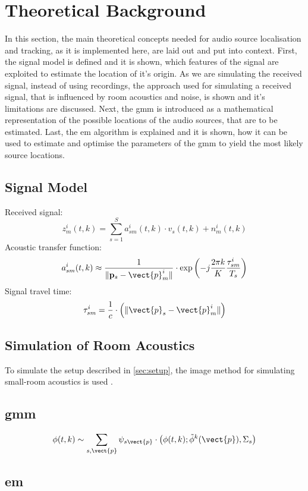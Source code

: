 \chapter{Theoretical Background}
\label{chap:theory}


In this section, the main theoretical concepts needed for audio source localisation and tracking, as it is implemented here, are laid out and put into context. First, the signal model is defined and it is shown, which features of the signal are exploited to estimate the location of it's origin. As we are simulating the received signal, instead of using recordings, the approach used for simulating a received signal, that is influenced by room acoustics and noise, is shown and it's limitations are discussed. Next, the \gls{gmm} is introduced as a mathematical representation of the possible locations of the audio sources, that are to be estimated. Last, the \gls{em} algorithm is explained and it is shown, how it can be used to estimate and optimise the parameters of the \gls{gmm} to yield the most likely source locations.

\section{Signal Model}
\label{sec:signal}
Received signal:
\begin{equation}
	z_m^i(t,k)=\sum_{s=1}^{S}a_{sm}^i(t,k)\cdot v_s(t,k)+n_m^i(t,k)
\end{equation}
Acoustic transfer function:
\begin{equation}
	a_{sm}^i(t,k)\approx\frac{1}{\|\mathbf{p}_s-\vect{p}_m^i\|}\cdot\exp{\left(-j\frac{2\pi k}{K}\frac{\tau^i_{sm}}{T_s}\right)}
\end{equation}
Signal travel time:
\begin{equation}
	\tau^i_{sm}=\frac{1}{c}\cdot\left(\|\vect{p}_s-\vect{p}_m^i\|\right)
\end{equation}

\section{Simulation of Room Acoustics}
\label{sec:simulation}
To simulate the setup described in \ref{sec:setup}, the image method for simulating small-room acoustics is used \cite{Allen1979}.

\section{\acrfull{gmm}}
\label{sec:gmm}
\begin{equation}
	\phi(t,k)\sim\sum_{s,\vect{p}}\psi_{s\vect{p}}\cdot\big(\phi(t,k);\tilde\phi^k(\vect{p}),\Sigma_s\big)
\end{equation}

\section{\acrfull{em}}
\label{sec:em}
